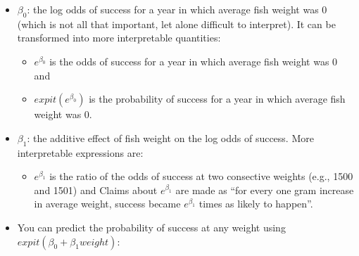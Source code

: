 \documentclass[]{book}
\newenvironment{Shaded}{\begin{snugshade}}{\end{snugshade}}
\newcommand{\CommentTok}[1]{\textcolor[rgb]{0.56,0.35,0.01}{\textit{#1}}}
\newcommand{\DataTypeTok}[1]{\textcolor[rgb]{0.13,0.29,0.53}{#1}}
\newcommand{\DecValTok}[1]{\textcolor[rgb]{0.00,0.00,0.81}{#1}}
\newcommand{\KeywordTok}[1]{\textcolor[rgb]{0.13,0.29,0.53}{\textbf{#1}}}
\newcommand{\NormalTok}[1]{#1}
\newcommand{\OperatorTok}[1]{\textcolor[rgb]{0.81,0.36,0.00}{\textbf{#1}}}
\newcommand{\StringTok}[1]{\textcolor[rgb]{0.31,0.60,0.02}{#1}}
\providecommand{\tightlist}{%
  \setlength{\itemsep}{0pt}\setlength{\parskip}{0pt}}
\begin{document}
\begin{itemize}
\tightlist
\item
  \(\beta_0\): the log odds of success for a year in which average fish weight was 0 (which is not all that important, let alone difficult to interpret). It can be transformed into more interpretable quantities:

  \begin{itemize}
  \tightlist
  \item
    \(e^{\beta_0}\) is the odds of success for a year in which average fish weight was 0 and
  \item
    \(expit(e^{\beta_0})\) is the probability of success for a year in which average fish weight was 0.
  \end{itemize}
\item
  \(\beta_1\): the additive effect of fish weight on the log odds of success. More interpretable expressions are:

  \begin{itemize}
  \tightlist
  \item
    \(e^{\beta_1}\) is the ratio of the odds of success at two consective weights (e.g., 1500 and 1501) and Claims about \(e^{\beta_1}\) are made as ``for every one gram increase in average weight, success became \(e^{\beta_1}\) times as likely to happen''.
  \end{itemize}
\item
  You can predict the probability of success at any weight using \(expit(\beta_0 + \beta_1 weight)\):
\end{itemize}

\begin{Shaded}
\end{Shaded}
\end{document}
